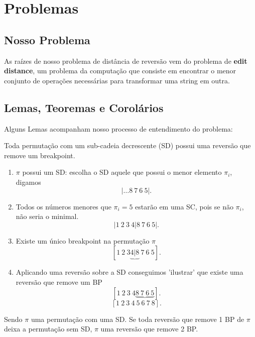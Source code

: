  \chapter{Problemas}

\section{Nosso Problema}
As raízes de nosso problema de distância de reversão vem do problema de \textbf{edit distance}, um problema da computação que consiste em 
encontrar o menor conjunto de operações necessárias para transformar uma string em outra.
\section{Lemas, Teoremas e Corolários}

Alguns Lemas acompanham nosso processo de entendimento do problema:

\begin{lema}
 Toda permutação com um sub-cadeia decrescente (SD) possui uma reversão que remove um breakpoint.
 
\end{lema}
\begin{enumerate}

    \item $\pi$ possui um SD: escolha o SD aquele que possui o menor elemento $\pi_i$, digamos \[
    |\ldots  8 \ 7 \ 6 \ 5 |.\]
   
    \item Todos os números menores que $\pi_i = 5$ estarão em uma SC, pois se não $\pi_i$, não seria o minimal. \[
    |1 \ 2 \ 3 \ 4 | 8 \ 7 \ 6 \ 5 |.\]
   
    \item Existe um único breakpoint na permutação $\pi$ \[
    [1 \ 2 \ 3 \underbrace{4 | 8} \ 7 \ 6 \ 5 ].\]
    
    \item Aplicando uma reversão sobre a SD conseguimos 'ilustrar' que existe uma reversão que remove um BP
    \[ [1 \ 2 \ 3 \ 4 \underbrace{8 \ 7 \ 6 \ 5} ].\]
    \[ [1 \ 2 \ 3 \ 4 \ 5 \ 6 \ 7 \ 8 ].\]

\end{enumerate}

\begin{lema}
 Sendo $\pi$ uma permutação com uma SD. Se toda reversão que remove 1 BP de $\pi$ deixa a permutação sem SD, $\pi$ uma reversão que remove 2 BP.
 
\end{lema}

